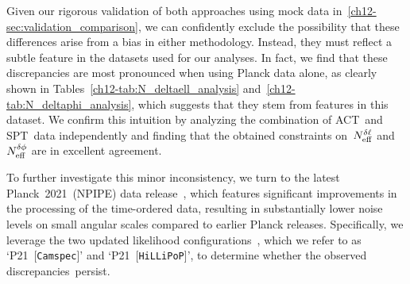 Given our rigorous validation of both approaches using mock data in~\textsection\ref{ch12-sec:validation_comparison}, we can confidently exclude the possibility that these differences arise from a bias in either methodology. Instead, they must reflect a subtle feature in the datasets used for our analyses. In fact, we find that these discrepancies are most pronounced when using Planck data alone, as clearly shown in Tables~\ref{ch12-tab:N_deltaell_analysis} and~\ref{ch12-tab:N_deltaphi_analysis}, which suggests that they stem from features in this dataset. We confirm this intuition by analyzing the combination of ACT~and SPT~data independently and finding that the obtained constraints on~$N_\mathrm{eff}^{\delta\ell}$ and~$N_\mathrm{eff}^{\delta\phi}$ are in excellent agreement.

To further investigate this minor inconsistency, we turn to the latest Planck~2021~(NPIPE) data release~\cite{Planck:2020olo}, which features significant improvements in the processing of the time-ordered data, resulting in substantially lower noise levels on small angular scales compared to earlier Planck releases. Specifically, we leverage the two updated likelihood configurations~\cite{Efstathiou:2019mdh, Rosenberg:2022sdy, Tristram:2020wbi, Tristram:2023haj}, which we refer to as `P21~[\texttt{Camspec}]' and `P21~[\texttt{HiLLiPoP}]', to determine whether the observed discrepancies~persist.\medskip

